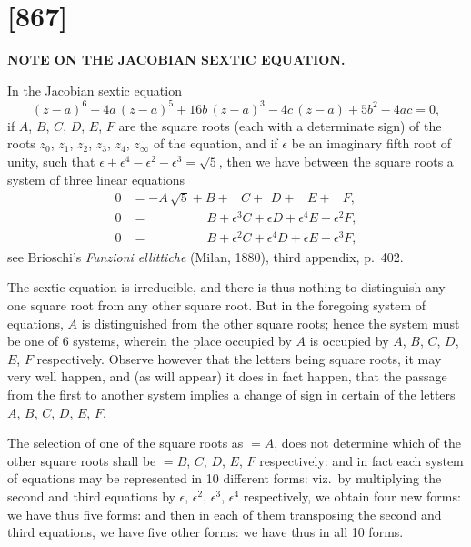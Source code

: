 \documentclass[12pt,a4paper]{article}
\theoremstyle{definition}
\begin{document}
\newpage
\section*{[867]}
\begin{center}
\large\textbf{NOTE ON THE JACOBIAN SEXTIC EQUATION.}
\end{center}

\begin{flushright}
\end{flushright}

In the Jacobian sextic equation
\[
(z-a)^6 - 4a\,(z-a)^5 + 16b\,(z-a)^3 - 4c\,(z-a) + 5b^2 - 4ac = 0,
\]
if $A$, $B$, $C$, $D$, $E$, $F$ are the square roots (each with a determinate sign) of the
roots $z_0$, $z_1$, $z_2$, $z_3$, $z_4$, $z_\infty$ of the equation, and if $\epsilon$ be an imaginary fifth root of
unity, such that $\epsilon + \epsilon^4 - \epsilon^2 - \epsilon^3 = \sqrt{5}$, then we have between the square roots a system
of three linear equations
\begin{align*}
0 &= -A\,\sqrt{5} + B + \phantom{\epsilon^3}C + \phantom{\epsilon}D + \phantom{\epsilon^4}E + \phantom{\epsilon^2}F,\\
0 &= \phantom{-A\sqrt{5} +}\; B + \epsilon^3 C + \epsilon D + \epsilon^4 E + \epsilon^2 F,\\
0 &= \phantom{-A\sqrt{5} +}\; B + \epsilon^2 C + \epsilon^4 D + \epsilon E + \epsilon^3 F,
\end{align*}
see Brioschi's \textit{Funzioni ellittiche} (Milan, 1880), third appendix, p.~402.

The sextic equation is irreducible, and there is thus nothing to distinguish any
one square root from any other square root. But in the foregoing system of equations,
$A$ is distinguished from the other square roots; hence the system must be one of
6 systems, wherein the place occupied by $A$ is occupied by $A$, $B$, $C$, $D$, $E$, $F$
respectively. Observe however that the letters being square roots, it may very well
happen, and (as will appear) it does in fact happen, that the passage from the first
to another system implies a change of sign in certain of the letters $A$, $B$, $C$, $D$, $E$, $F$.

The selection of one of the square roots as $= A$, does not determine which of
the other square roots shall be $= B$, $C$, $D$, $E$, $F$ respectively: and in fact each system
of equations may be represented in 10 different forms: viz.\ by multiplying the second
and third equations by $\epsilon$, $\epsilon^2$, $\epsilon^3$, $\epsilon^4$ respectively, we obtain four new forms: we have
thus five forms: and then in each of them transposing the second and third equations,
we have five other forms: we have thus in all 10 forms.
\end{document}
